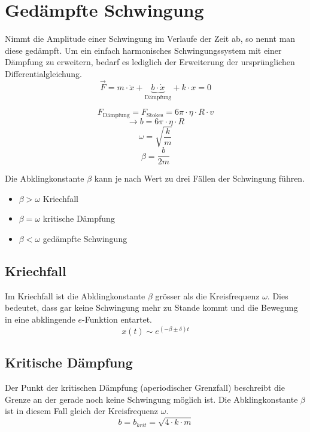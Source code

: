 \section{Gedämpfte Schwingung}
Nimmt die Amplitude einer Schwingung im Verlaufe der Zeit ab, so nennt 
man diese gedämpft. Um ein einfach harmonisches Schwingungssystem mit 
einer Dämpfung zu erweitern, bedarf es lediglich der Erweiterung der
ursprünglichen Differentialgleichung.
\[ \boxed{\vec{F} 
	= m \cdot \ddot{x} + \underbrace{
		b \cdot \dot{x}}_{\text{Dämpfung}} 
	+ k \cdot x = 0
} \]



\[ \boxed{F_{\text{Dämpfung}} = F_{\text{Stokes}} 
= 6 \pi \cdot \eta \cdot R \cdot v} \]
\[ \boxed{\rightarrow b = 6 \pi \cdot \eta \cdot R} \]
\[ \boxed{\omega = \sqrt{\frac{k}{m}}} \]
\[ \boxed{\beta = \frac{b}{2 m}} \]

Die Abklingkonstante $\beta$ kann je nach Wert zu drei Fällen der
Schwingung führen.
\begin{itemize}
	\item $\beta > \omega$ \hfill{} Kriechfall
	\item $\beta = \omega$ \hfill{} kritische Dämpfung
	\item $\beta < \omega$ \hfill{} gedämpfte Schwingung
\end{itemize}

\subsection{Kriechfall}
Im Kriechfall ist die Abklingkonstante $\beta$ grösser als die 
Kreisfrequenz $\omega$. Dies bedeutet, dass gar keine Schwingung
mehr zu Stande kommt und die Bewegung in eine abklingende 
$e$-Funktion entartet.
\[ \boxed{x(t) \sim e^{(-\beta \pm \delta)t}} \]

\subsection{Kritische Dämpfung}
Der Punkt der kritischen Dämpfung (aperiodischer Grenzfall) beschreibt
die Grenze an der gerade noch keine Schwingung möglich ist. Die 
Abklingkonstante $\beta$ ist in diesem Fall gleich der Kreisfrequenz
$\omega$. 
\[ \boxed{b = b_{krit} = \sqrt{4 \cdot k \cdot m}} \]

